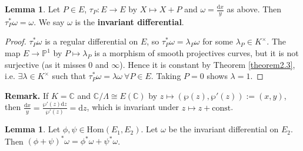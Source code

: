 \documentclass{article}
\theoremstyle{definition}
\newtheorem{lemma}[theorem]{Lemma}
\begin{document}
\begin{lemma}
    Let $P \in E$, $\tau_P : E \to E$ by $X \mapsto X+P$ and $\omega = \frac{\mathrm{d}x}{y}$ as above. Then $\tau_P^*\omega = \omega$. We say $\omega$ is the \textbf{invariant differential}.
\end{lemma}
\begin{proof}
    $\tau_P^*\omega$ is a regular differential on $E$, so $\tau_P^* \omega = \lambda_P \omega$ for some $\lambda_P \in K^\times$. The map $E \to \mathbb{P}^1$ by $P \mapsto \lambda_P$ is a morphism of smooth projectives curves, but it is not surjective (as it misses $0$ and $\infty$). Hence it is constant by Theorem \ref{theorem2.3}, i.e. $\exists \lambda \in K^\times$ such that $\tau_P^* \omega = \lambda \omega ~\forall P \in E$. Taking $P=0$ shows $\lambda=1$.
\end{proof}
\textbf{Remark.} If $K=\mathbb{C}$ and $\mathbb{C}/\Lambda \cong E(\mathbb{C})$ by $ z\mapsto (\wp(z),\wp'(z)) := (x,y)$, then $\frac{\mathrm{d}x}{y} = \frac{\wp'(z)\mathrm{d}z}{\wp'(z)}=\mathrm{d}z$, which is invariant under $z \mapsto z + \text{const}$.
\begin{lemma}\label{lemma6.3}
    Let $\phi,\psi \in \text{Hom}(E_1,E_2)$. Let $\omega$ be the invariant differential on $E_2$. Then $(\phi+\psi)^* \omega = \phi^* \omega + \psi^* \omega$.
\end{lemma}
\end{document}
